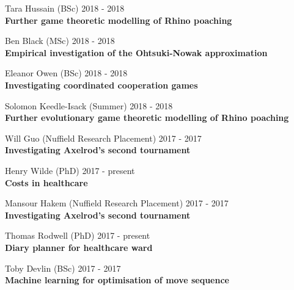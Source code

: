 \documentclass[10pt]{res} %
\begin{document}
\begin{resume}
\vspace{12pt} %

\begin{etaremune}
\item
    Tara Hussain (BSc) \hfill 2018 -
    2018\\
\textbf{Further game theoretic modelling of Rhino poaching}\\

\item
    Ben Black (MSc) \hfill 2018 -
    2018\\
\textbf{Empirical investigation of the Ohtsuki-Nowak approximation}\\

\item
    Eleanor Owen (BSc) \hfill 2018 -
    2018\\
\textbf{Investigating coordinated cooperation games}\\

\item
    Solomon Keedle-Isack (Summer) \hfill 2018 -
    2018\\
\textbf{Further evolutionary game theoretic modelling of Rhino poaching}\\

\item
    Will Guo (Nuffield Research Placement) \hfill 2017 -
    2017\\
\textbf{Investigating Axelrod's second tournament}\\

\item
    Henry Wilde (PhD) \hfill 2017 -
    present\\
\textbf{Costs in healthcare}\\

\item
    Mansour Hakem (Nuffield Research Placement) \hfill 2017 -
    2017\\
\textbf{Investigating Axelrod's second tournament}\\

\item
    Thomas Rodwell (PhD) \hfill 2017 -
    present\\
\textbf{Diary planner for healthcare ward}\\

\item
    Toby Devlin (BSc) \hfill 2017 -
    2017\\
\textbf{Machine learning for optimisation of move sequence}\\


\end{etaremune}
\end{resume}
\end{document}
